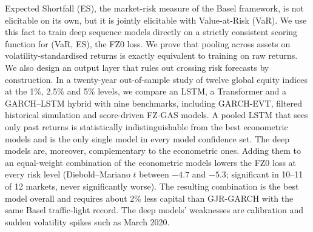 Expected Shortfall (ES), the market-risk measure of the Basel framework, is not elicitable on its own, but it is jointly elicitable with Value-at-Risk (VaR). We use this fact to train deep sequence models directly on a strictly consistent scoring function for (VaR, ES), the FZ0 loss. We prove that pooling across assets on volatility-standardised returns is exactly equivalent to training on raw returns. We also design an output layer that rules out crossing risk forecasts by construction. In a twenty-year out-of-sample study of twelve global equity indices at the 1\%, 2.5\% and 5\% levels, we compare an LSTM, a Transformer and a GARCH--LSTM hybrid with nine benchmarks, including GARCH-EVT, filtered historical simulation and score-driven FZ-GAS models. A pooled LSTM that sees only past returns is statistically indistinguishable from the best econometric models and is the only single model in every model confidence set. The deep models are, moreover, complementary to the econometric ones. Adding them to an equal-weight combination of the econometric models lowers the FZ0 loss at every risk level (Diebold--Mariano $t$ between $-4.7$ and $-5.3$; significant in 10--11 of 12 markets, never significantly worse). The resulting combination is the best model overall and requires about 2\% less capital than GJR-GARCH with the same Basel traffic-light record. The deep models' weaknesses are calibration and sudden volatility spikes such as March 2020.
